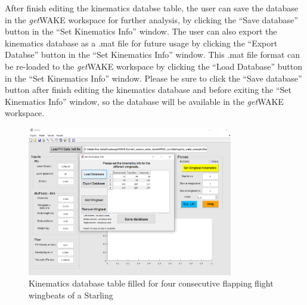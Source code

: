\documentclass[12pt,a4paper]{article}
\begin{document}
After finish editing the kinematics databse table, the user can save the database in the \textit{get}WAKE workspace for further analysis, by clicking the ``Save database'' button in the ``Set Kinematics Info'' window. 
The user can also export the kinematics database as a .mat file for future usage by clicking the ``Export Databse'' button in the ``Set Kinematics Info'' window. 
This .mat file format can be re-loaded to the \textit{get}WAKE workspace by clicking the ``Load Database'' button in the ``Set Kinematics Info'' window.
Please be sure to click the ``Save database'' button after finish editing the kinematics database and before exiting the ``Set Kinematics Info'' window, so the database will be available in the \textit{get}WAKE workspace.


\begin{figure}[ht!]
	\centering
	\includegraphics[width=0.8\textwidth]{Kinematics-db-filled}
	\caption{Kinematics database table filled for four consecutive flapping flight wingbeats of a Starling}
	\label{fig:GUI-Kinematics-db-filled}
\end{figure}



\newpage
\end{document}
